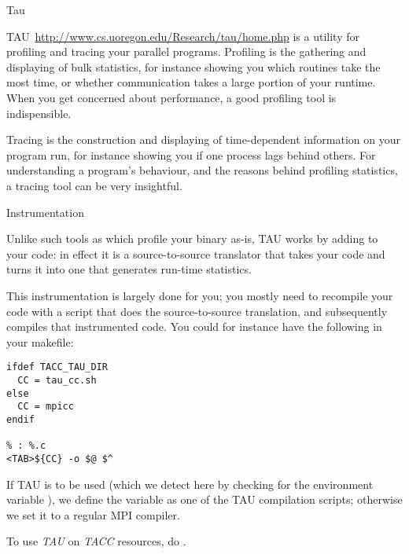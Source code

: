 
 {Tau}


TAU~\url{http://www.cs.uoregon.edu/Research/tau/home.php} is a utility
for profiling and tracing your parallel programs. Profiling is the
gathering and displaying of bulk statistics, for instance showing you
which routines take the most time, or whether communication takes a
large portion of your runtime. When you get concerned about
performance, a good profiling tool is indispensible.

Tracing is the construction and displaying of time-dependent
information on  your program run, for instance showing you if one
process lags behind others. For understanding a program's behaviour,
and the reasons behind profiling statistics, a tracing tool can be
very insightful.

 {Instrumentation}

Unlike such tools as  which profile your binary as-is,
TAU works by adding  to your code: in
effect it is a source-to-source translator that takes your code and
turns it into one that generates run-time statistics.

This instrumentation is largely done for you; you mostly need to recompile
your code with a script that does the source-to-source translation,
and subsequently compiles that instrumented code.
You could for instance have the following in your makefile:
\begin{verbatim}
ifdef TACC_TAU_DIR
  CC = tau_cc.sh
else
  CC = mpicc
endif

% : %.c
<TAB>${CC} -o $@ $^
\end{verbatim}
If TAU is to be used (which we detect here by checking for the environment variable
), we define the  variable as
one of the TAU compilation scripts; otherwise we set it to a regular MPI compiler.

\begin{istc}
To use \emph{TAU} on \emph{TACC} resources,
do .
\end{istc}

